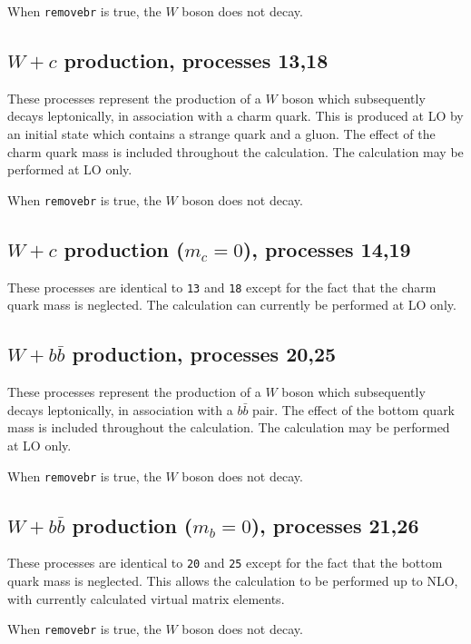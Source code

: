 \documentclass[12pt]{article}
\begin{document}
When {\tt removebr} is true, the $W$ boson does not decay.

\subsection{$W+c$ production, processes 13,18}
\label{subsec:wc}

These processes represent the production of a $W$ boson which subsequently
decays leptonically, in association with a charm quark. This is produced at LO
by an initial state which contains a strange quark and a gluon. The effect of
the charm quark mass is included throughout the calculation.  
The calculation may be performed at LO only.

When {\tt removebr} is true, the $W$ boson does not decay.

\subsection{$W+c$ production ($m_c=0$), processes 14,19}
\label{subsec:wcmassless}

These processes are identical to {\tt 13} and {\tt 18} except for the fact
that the charm quark mass is neglected. The calculation can currently be
performed at LO only.

\subsection{$W+b{\bar b}$ production, processes 20,25}
\label{subsec:wbb}

These processes represent the production of a $W$ boson which subsequently
decays leptonically, in association with a $b{\bar b}$ pair. The effect of
the bottom quark mass is included throughout the calculation.  
The calculation may be performed at LO only.

When {\tt removebr} is true, the $W$ boson does not decay.

\subsection{$W+b{\bar b}$ production ($m_b=0$), processes 21,26}
\label{subsec:wbbmassless}

These processes are identical to {\tt 20} and {\tt 25} except for the fact
that the bottom quark mass is neglected. This allows the calculation to be
performed up to NLO, with currently calculated virtual matrix elements.

When {\tt removebr} is true, the $W$ boson does not decay.
\end{document}
